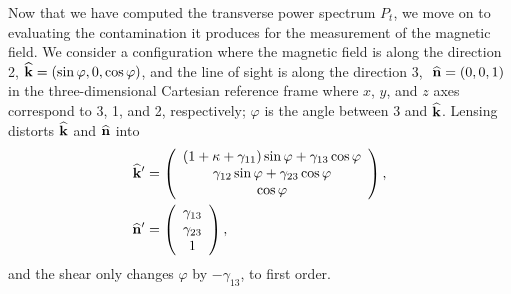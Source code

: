 Now that we have computed the transverse power spectrum $P_t$, we move on to evaluating the contamination it produces for the measurement of the magnetic field. We consider a configuration where the magnetic field is along the direction 2, ${\bf{\widehat k}}=(\sin\varphi,0,\cos\varphi)$, and the line of sight is along the direction 3, $\ {\bf{\widehat n}}=(0,0,1)$ in the three-dimensional Cartesian reference frame where $x$, $y$, and $z$ axes correspond to 3, 1, and 2, respectively; $\varphi$ is the angle between 3 and ${\bf{\widehat k}}$. Lensing distorts ${\bf{\widehat k}}$ and ${\bf{\widehat n}}$ into
\begin{align}
{\bf{\widehat k}}'&=\left(\begin{array}{c}
(1+\kappa+\gamma_{11})\sin\varphi+\gamma_{13}\cos\varphi\\
\gamma_{12}\sin\varphi+\gamma_{23}\cos\varphi\\
\cos\varphi
\end{array}\right),\nonumber\\
{\bf{\widehat n}}'&=\left(\begin{array}{c}
\gamma_{13}\\
\gamma_{23}\\
1
\end{array}\right),
\label{eq:distorted_kn}
\end{align}
and the shear only changes $\varphi$ by $-\gamma_{13}$, to first order.


